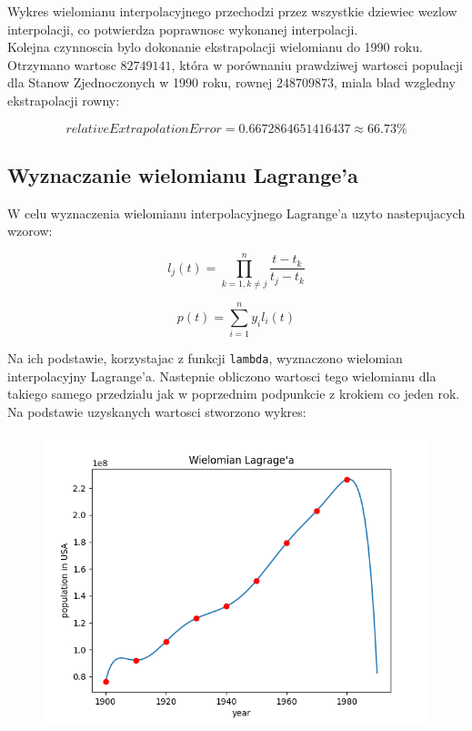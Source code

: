 \documentclass{article}
\begin{document}
	Wykres wielomianu interpolacyjnego przechodzi przez wszystkie dziewiec wezlow interpolacji, co potwierdza poprawnosc wykonanej interpolacji.\\
	Kolejna czynnoscia bylo dokonanie ekstrapolacji wielomianu do 1990 roku. Otrzymano wartosc $82749141$, która w porównaniu prawdziwej wartosci populacji dla Stanow Zjednoczonych w 1990 roku, rownej $248709873$, miala blad wzgledny ekstrapolacji rowny:
	
	\begin{equation}
		relativeExtrapolationError = 0.6672864651416437 \approx 66.73 \%
	\end{equation}
	
	
	
	\subsection*{Wyznaczanie wielomianu Lagrange'a}
	
	W celu wyznaczenia wielomianu interpolacyjnego Lagrange'a uzyto nastepujacych wzorow:
	
	\begin{equation}
		l_j (t) = \prod _{k=1, k \neq j} ^ n \frac{t-t_k}{t_j - t_k}
	\end{equation}
	
	\begin{equation}
		p (t) = \sum _{i=1} ^n y_i  l_i(t)
	\end{equation}
	
	Na ich podstawie, korzystajac z funkcji \texttt{lambda}, wyznaczono wielomian interpolacyjny Lagrange'a. Nastepnie obliczono wartosci tego wielomianu dla takiego samego przedzialu jak w poprzednim podpunkcie z krokiem co jeden rok. Na podstawie uzyskanych wartosci stworzono wykres:
	
	\begin{figure}[h]
    		\centering
  		\includegraphics[scale = 0.9]{wykres2.png}
	\end{figure}
	
\end{document}

